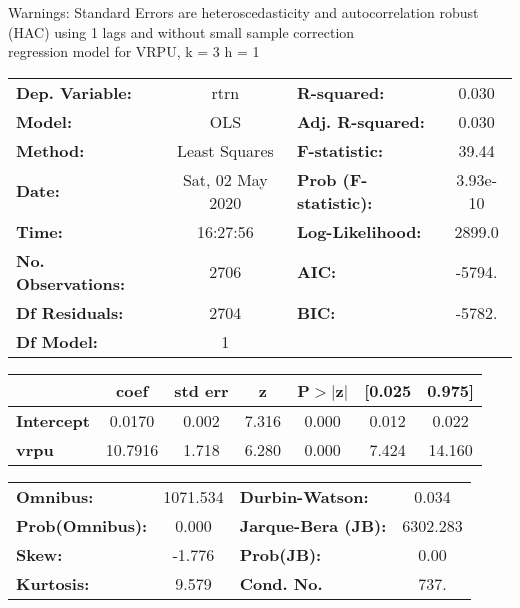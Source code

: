 Warnings: \newline
 [1] Standard Errors are heteroscedasticity and autocorrelation robust (HAC) using 1 lags and without small sample correction\\ 

regression model for VRPU, k = 3 h = 1\begin{center}
\begin{tabular}{lclc}
\toprule
\textbf{Dep. Variable:}    &       rtrn       & \textbf{  R-squared:         } &     0.030   \\
\textbf{Model:}            &       OLS        & \textbf{  Adj. R-squared:    } &     0.030   \\
\textbf{Method:}           &  Least Squares   & \textbf{  F-statistic:       } &     39.44   \\
\textbf{Date:}             & Sat, 02 May 2020 & \textbf{  Prob (F-statistic):} &  3.93e-10   \\
\textbf{Time:}             &     16:27:56     & \textbf{  Log-Likelihood:    } &    2899.0   \\
\textbf{No. Observations:} &        2706      & \textbf{  AIC:               } &    -5794.   \\
\textbf{Df Residuals:}     &        2704      & \textbf{  BIC:               } &    -5782.   \\
\textbf{Df Model:}         &           1      & \textbf{                     } &             \\
\bottomrule
\end{tabular}
\begin{tabular}{lcccccc}
                   & \textbf{coef} & \textbf{std err} & \textbf{z} & \textbf{P$> |$z$|$} & \textbf{[0.025} & \textbf{0.975]}  \\
\midrule
\textbf{Intercept} &       0.0170  &        0.002     &     7.316  &         0.000        &        0.012    &        0.022     \\
\textbf{vrpu}      &      10.7916  &        1.718     &     6.280  &         0.000        &        7.424    &       14.160     \\
\bottomrule
\end{tabular}
\begin{tabular}{lclc}
\textbf{Omnibus:}       & 1071.534 & \textbf{  Durbin-Watson:     } &    0.034  \\
\textbf{Prob(Omnibus):} &   0.000  & \textbf{  Jarque-Bera (JB):  } & 6302.283  \\
\textbf{Skew:}          &  -1.776  & \textbf{  Prob(JB):          } &     0.00  \\
\textbf{Kurtosis:}      &   9.579  & \textbf{  Cond. No.          } &     737.  \\
\bottomrule
\end{tabular}
\end{center}

